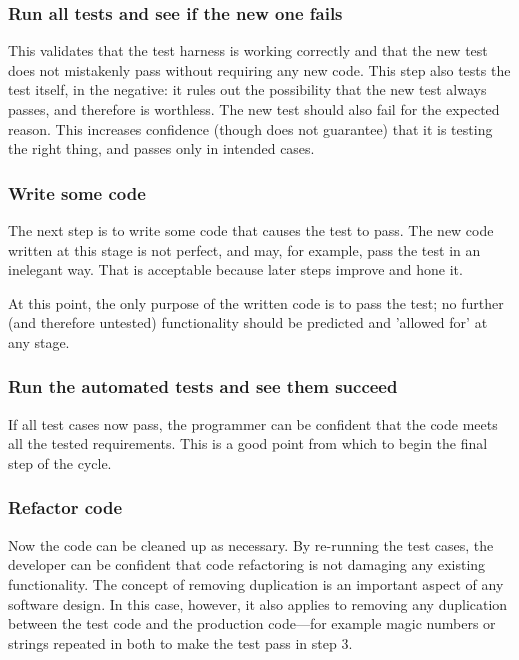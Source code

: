 \subsubsection{Run all tests and see if the new one fails}

This validates that the test harness is working correctly and that the new test does not mistakenly pass without requiring any new code. This step also tests the test itself, in the negative: it rules out the possibility that the new test always passes, and therefore is worthless. The new test should also fail for the expected reason. This increases confidence (though does not guarantee) that it is testing the right thing, and passes only in intended cases.

\subsubsection{Write some code}

The next step is to write some code that causes the test to pass. The new code written at this stage is not perfect, and may, for example, pass the test in an inelegant way. That is acceptable because later steps improve and hone it.

At this point, the only purpose of the written code is to pass the test; no further (and therefore untested) functionality should be predicted and 'allowed for' at any stage.

\subsubsection{Run the automated tests and see them succeed}

If all test cases now pass, the programmer can be confident that the code meets all the tested requirements. This is a good point from which to begin the final step of the cycle.

\subsubsection{Refactor code}

Now the code can be cleaned up as necessary. By re-running the test cases, the developer can be confident that code refactoring is not damaging any existing functionality. The concept of removing duplication is an important aspect of any software design. In this case, however, it also applies to removing any duplication between the test code and the production code—for example magic numbers or strings repeated in both to make the test pass in step 3.

